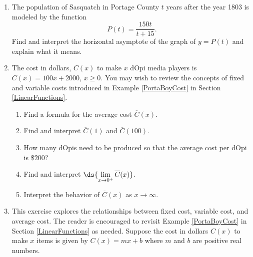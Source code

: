 \documentclass{ximera}
\begin{document}
\begin{enumerate}
\begin{multicols}{4}
\begin{enumerate}
\item $t_{0} = 9$

\item $t_{0} = 10$

\item  $t_{0} = 11$

\end{enumerate}

\end{multicols}


\item \label{squatchpop} The population of Sasquatch in Portage County $t$ years after the year 1803 is modeled by the function \[P(t) = \frac{150t}{t + 15}.\] Find and interpret the horizontal asymptote of the graph of $y = P(t)$ and explain what it means.

\item  The cost in dollars, $C(x)$ to make $x$ dOpi media players is $C(x) = 100x+2000$, $x \geq 0$.  You may wish to review the concepts of fixed and variable costs introduced in  Example \ref{PortaBoyCost} in Section \ref{LinearFunctions}.

\begin{enumerate}

\item  Find a formula for the average cost $\overline{C}(x)$.

\item  Find and interpret $\overline{C}(1)$ and $\overline{C}(100)$.

\item  How many dOpis need to be produced so that the average cost per dOpi is $\$ 200$?

\item  Find and interpret $\ds{ \lim_{x \rightarrow 0^{+}} \overline{C}(x)}$.

\item  Interpret the behavior of $\overline{C}(x)$ as $x \rightarrow \infty$.

\end{enumerate}

\item  \label{averagevariablecostexercise}   This exercise explores the relationships between fixed cost, variable cost, and average cost.  The reader is encouraged to revisit Example \ref{PortaBoyCost} in Section \ref{LinearFunctions} as needed.  Suppose the cost in dollars $C(x)$ to make $x$ items is given by $C(x) = mx + b$ where $m$ and $b$ are positive real numbers.

\begin{enumerate}


\end{enumerate}
\end{enumerate}
\end{document}
